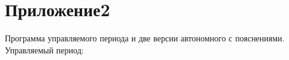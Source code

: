 \section{Приложение2}
Программа управляемого периода и две версии автономного с пояснениями. \newline
Управляемый период:

\begin{figure}[H]
	\begin{minipage}[h]{1\linewidth}
	\end{minipage}
\end{figure}
\fillpage

